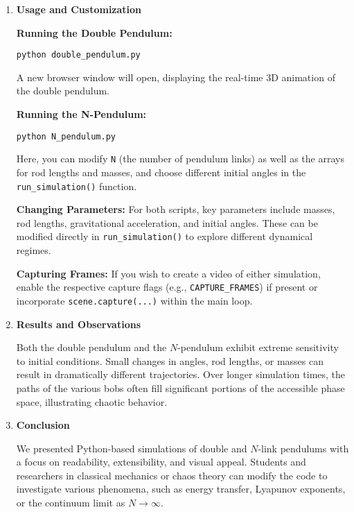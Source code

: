 \documentclass[letterpaper,12pt]{article}
\begin{document}
\begin{enumerate}[leftmargin=*, itemsep=1em]
\item \textbf{Usage and Customization}
\label{sec:usage}

\textbf{Running the Double Pendulum:}
\begin{verbatim}
python double_pendulum.py
\end{verbatim}
A new browser window will open, displaying the real-time 3D animation of the double pendulum.

\textbf{Running the N-Pendulum:}
\begin{verbatim}
python N_pendulum.py
\end{verbatim}
Here, you can modify \texttt{N} (the number of pendulum links) as well as the arrays for rod lengths and masses, and choose different initial angles in the \texttt{run\_simulation()} function.

\textbf{Changing Parameters:} For both scripts, key parameters include masses, rod lengths, gravitational acceleration, and initial angles. These can be modified directly in \texttt{run\_simulation()} to explore different dynamical regimes.

\textbf{Capturing Frames:} If you wish to create a video of either simulation, enable the respective capture flags (e.g., \texttt{CAPTURE\_FRAMES}) if present or incorporate \texttt{scene.capture(...)} within the main loop.

\item \textbf{Results and Observations}

Both the double pendulum and the $N$-pendulum exhibit extreme sensitivity to initial conditions. Small changes in angles, rod lengths, or masses can result in dramatically different trajectories. Over longer simulation times, the paths of the various bobs often fill significant portions of the accessible phase space, illustrating chaotic behavior.

\item \textbf{Conclusion}

We presented Python-based simulations of double and $N$-link pendulums with a focus on readability, extensibility, and visual appeal. Students and researchers in classical mechanics or chaos theory can modify the code to investigate various phenomena, such as energy transfer, Lyapunov exponents, or the continuum limit as $N\to\infty$.


\end{enumerate}
\end{document}
